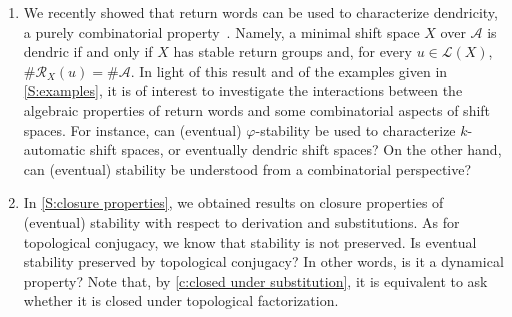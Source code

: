 \documentclass{amsart}
\newcommand*{\ret}{\mathcal{R}}
\newcommand*{\lang}{\mathcal{L}}
\newcommand*{\cA}{\mathcal{A}}
\newcommand*{\card}{\#}
\theoremstyle{plain}
\theoremstyle{definition}
\theoremstyle{remark}
\begin{document}
\begin{enumerate}
    \item We recently showed that return words can be used to characterize dendricity, a purely combinatorial property~\cite{pre/Gheeraert2024}. Namely, a minimal shift space $X$ over $\cA$ is dendric if and only if $X$ has stable return groups and, for every $u \in \lang(X)$, $\card\ret_X(u) = \card\cA$. In light of this result and of the examples given in \cref{S:examples}, it is of interest to investigate the interactions between the algebraic properties of return words and some combinatorial aspects of shift spaces. For instance, can (eventual) $\varphi$-stability be used to characterize $k$-automatic shift spaces, or eventually dendric shift spaces? On the other hand, can (eventual) stability be understood from a combinatorial perspective?

    \item In \cref{S:closure properties}, we obtained results on closure properties of (eventual) stability with respect to derivation and substitutions. As for topological conjugacy, we know that stability is not preserved. Is eventual stability preserved by topological conjugacy? In other words, is it a dynamical property? Note that, by \cref{c:closed under substitution}, it is equivalent to ask whether it is closed under topological factorization.
\end{enumerate}



\end{document}
